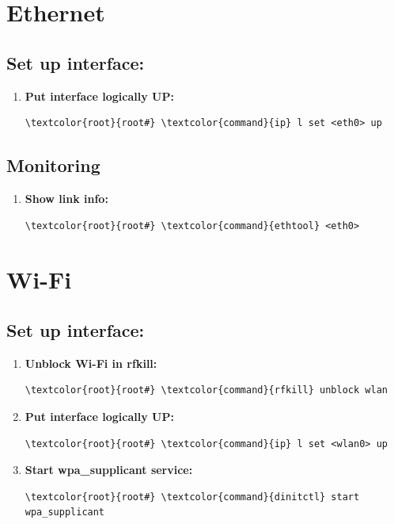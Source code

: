 \documentclass[10pt, a4paper, onecolumn, oneside, titlepage, openany]{book}
\begin{document}
\section{Ethernet}
\subsection{Set up interface:}
\begin{enumerate}
    \item \textbf{Put interface logically UP:}
\begin{Verbatim}[commandchars=\\\{\}]
\textcolor{root}{root#} \textcolor{command}{ip} l set <eth0> up
\end{Verbatim}
\end{enumerate}
\subsection{Monitoring}
\begin{enumerate}
    \item \textbf{Show link info:}
\begin{Verbatim}[commandchars=\\\{\}]
\textcolor{root}{root#} \textcolor{command}{ethtool} <eth0>
\end{Verbatim}
\end{enumerate}
\section{Wi-Fi}
\subsection{Set up interface:}
\begin{enumerate}
    \item \textbf{Unblock Wi-Fi in rfkill:}
\begin{Verbatim}[commandchars=\\\{\}]
\textcolor{root}{root#} \textcolor{command}{rfkill} unblock wlan
\end{Verbatim}
    \item \textbf{Put interface logically UP:}
\begin{Verbatim}[commandchars=\\\{\}]
\textcolor{root}{root#} \textcolor{command}{ip} l set <wlan0> up
\end{Verbatim}
    \item \textbf{Start wpa\_supplicant service:}
\begin{Verbatim}[commandchars=\\\{\}]
\textcolor{root}{root#} \textcolor{command}{dinitctl} start wpa_supplicant
\end{Verbatim}
\end{enumerate}
\end{document}
